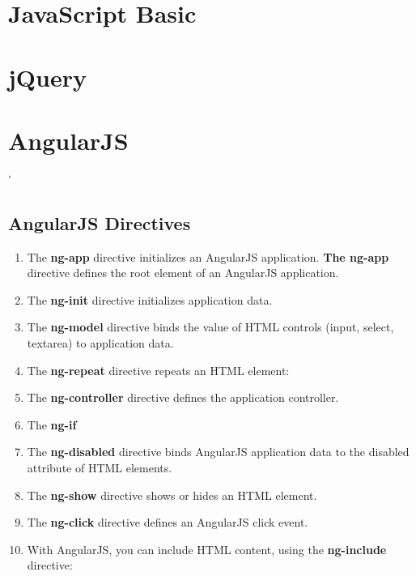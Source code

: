 \chapter{ JavaScript Basic }



\chapter{ jQuery }

\chapter{ AngularJS }'

\section{AngularJS Directives}

\begin{enumerate}
    \item  The \textbf{ng-app} directive initializes an AngularJS application. \textbf{The ng-app} directive defines the root element of an AngularJS application.

    \item  The \textbf{ng-init} directive initializes application data.

    \item  The \textbf{ng-model} directive binds the value of HTML controls (input, select, textarea) to application data.
        
    \item  The \textbf{ng-repeat} directive repeats an HTML element:
    
    \item  The \textbf{ng-controller} directive defines the application controller.
    
    \item  The \textbf{ng-if} 
    
    \item The \textbf{ng-disabled} directive binds AngularJS application data to the disabled attribute of HTML elements.
        
    \item The \textbf{ng-show} directive shows or hides an HTML element.
    
    \item The \textbf{ng-click} directive defines an AngularJS click event.
    
    \item With AngularJS, you can include HTML content, using the \textbf{ng-include} directive:
\end{enumerate}

